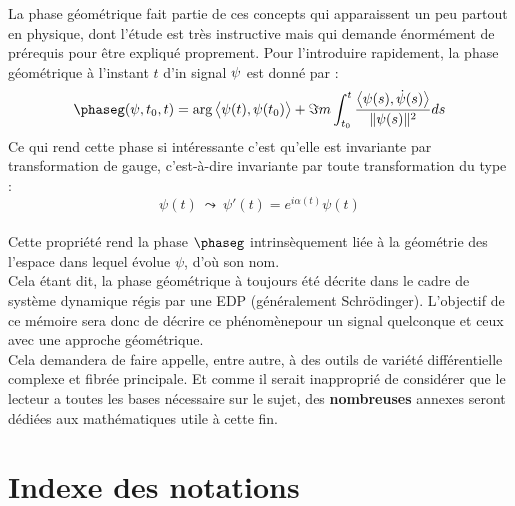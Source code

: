 La phase géométrique fait partie de ces concepts qui apparaissent un peu partout en physique, dont l'étude est très instructive mais qui demande énormément de prérequis pour être expliqué proprement.
Pour l'introduire rapidement, la phase géométrique à l'instant $t$ d'in signal $\bf{\psi}$ est donné par :
\[\phaseg(\psi, t_0, t) = \arg\big\langle \psi(t), \psi(t_0)\big\rangle + \Im m\int_{t_0}^t \frac{\big\langle \psi(s) , \dot{\psi}(s) \big\rangle}{\|\psi(s)\|^2} ds\]
Ce qui rend cette phase si intéressante c'est qu'elle est invariante par transformation de gauge, c'est-à-dire invariante par toute transformation du type :
\[\psi(t)\ \leadsto\ \psi'(t) = e^{i\alpha(t)}\psi(t) \]
\\
Cette propriété rend la phase $\phaseg$ intrinsèquement liée à la géométrie des l'espace dans lequel évolue $\psi$, d'où son nom.
\\

Cela étant dit, la phase géométrique à toujours été décrite dans le cadre de système dynamique régis par une EDP (généralement Schrödinger).
L'objectif de ce mémoire sera donc de décrire ce phénomènepour un  signal quelconque et ceux avec une approche géométrique.
\\
Cela demandera de faire appelle, entre autre, à des outils de variété différentielle complexe et fibrée principale. 
Et comme il serait inapproprié de considérer que le lecteur a toutes les bases nécessaire sur le sujet, des \textbf{nombreuses} annexes seront dédiées aux mathématiques utile à cette fin.





\newpage

{}
\section*{Indexe des notations}\label{sec:index_nota}

